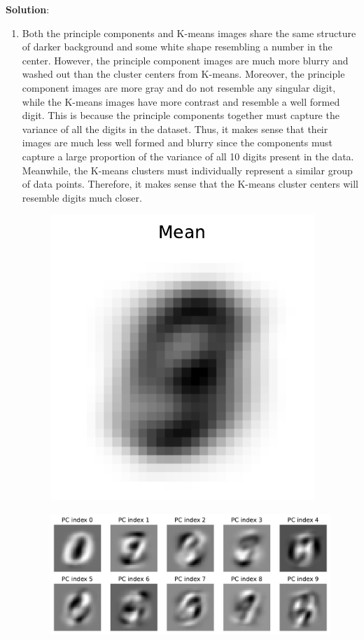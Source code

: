 \documentclass[submit]{../harvardml}
\newenvironment{solution}{
    \vspace{2mm}
    \color{blue}\noindent\textbf{Solution}:
}{}
\begin{document}
\begin{solution}
\begin{enumerate}
    \item Both the principle components and K-means images share the same structure of darker background and some white shape resembling a number in the center. However, the principle component images are much more blurry and washed out than the cluster centers from K-means. Moreover, the principle component images are more gray and do not resemble any singular digit, while the K-means images have more contrast and resemble a well formed digit. This is because the principle components together must capture the variance of all the digits in the dataset. Thus, it makes sense that their images are much less well formed and blurry since the components must capture a large proportion of the variance of all 10 digits present in the data. Meanwhile, the K-means clusters must individually represent a similar group of data points. Therefore, it makes sense that the K-means cluster centers will resemble digits much closer. 
    \begin{figure}[H]
        \centering
        \includegraphics[width=0.3\linewidth]{hw5/img_output/p3_mean.pdf}
    \end{figure}
    \begin{figure}[H]
        \centering
        \includegraphics[width=0.9\linewidth]{hw5/img_output/p3_pcomps.pdf}
    \end{figure}
    

\end{enumerate}
\end{solution}
\end{document}
